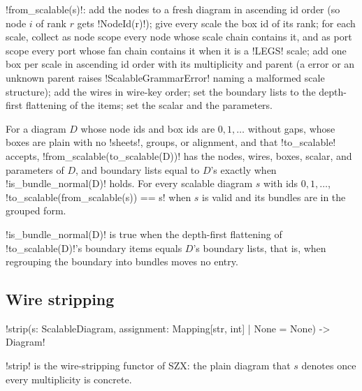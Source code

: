 \begin{algorithm}\label{alg:diagrams-from-scalable}
\py!from_scalable(s)!: add the nodes to a fresh diagram in ascending id order (so node $i$ of rank $r$ gets \py!NodeId(r)!); give every scale the box id of its rank; for each scale, collect as node scope every node whose scale chain contains it, and as port scope every port whose fan chain contains it when it is a \code!LEGS! scale; add one box per scale in ascending id order with its multiplicity and parent (a \bbox{} error or an unknown parent raises \py!ScalableGrammarError! naming a malformed scale structure); add the wires in wire-key order; set the boundary lists to the depth-first flattening of the items; set the scalar and the parameters.
\end{algorithm}

\begin{proposition}[Losslessness]\label{prop:diagrams-lossless}
For a diagram $D$ whose node ids and box ids are $0,1,\dots$ without gaps, whose boxes are plain with no \py!sheets!, groups, or alignment, and that \py!to_scalable! accepts, \py!from_scalable(to_scalable(D))! has the nodes, wires, boxes, scalar, and parameters of $D$, and boundary lists equal to $D$'s exactly when \py!is_bundle_normal(D)! holds. For every scalable diagram $s$ with ids $0,1,\dots$, \py!to_scalable(from_scalable(s)) == s! when $s$ is valid and its bundles are in the grouped form.
\end{proposition}

\py!is_bundle_normal(D)! is true when the depth-first flattening of \py!to_scalable(D)!'s boundary items equals $D$'s boundary lists, that is, when regrouping the boundary into bundles moves no entry.

\subsection{Wire stripping}

\begin{signature}
\py!strip(s: ScalableDiagram, assignment: Mapping[str, int] | None = None) -> Diagram!
\end{signature}

\py!strip! is the wire-stripping functor of SZX: the plain diagram that $s$ denotes once every multiplicity is concrete.

